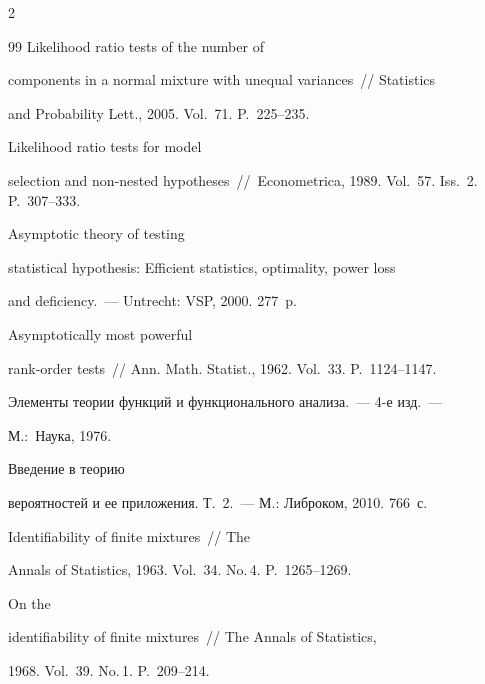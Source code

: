 \begin{multicols}{2}
{{\begin{thebibliography}{99}
  Likelihood ratio tests of the number of

components in a normal mixture with unequal variances~// Statistics

and Probability Lett., 2005. Vol.~71. P.~225--235.



 Likelihood ratio tests for model

selection and non-nested hypotheses~//~Econometrica, 1989. Vol.~57. Iss.~2. P.~307--333.



 Asymptotic theory of testing

statistical hypothesis: Efficient statistics, optimality, power loss

and deficiency.~--- Untrecht: VSP, 2000. 277~p.



 Asymptotically most powerful

rank-order tests~// Ann. Math. Statist., 1962. Vol.~33. P.~1124--1147.




Элементы теории функций и функционального анализа.~--- 4-е изд.~---

М.:~Наука, 1976.



 Введение в теорию

вероятностей и ее приложения. Т.~2.~--- М.: Либроком, 2010. 766~с.



  Identifiability of finite mixtures~// The

Annals of Statistics, 1963. Vol.~34. No.\,4. P.~1265--1269.



\label{end\stat}



  On the

identifiability of finite mixtures~// The Annals of Statistics,

1968. Vol.~39. No.\,1. P.~209--214.

 \end{thebibliography}

}

}





\end{multicols}       

